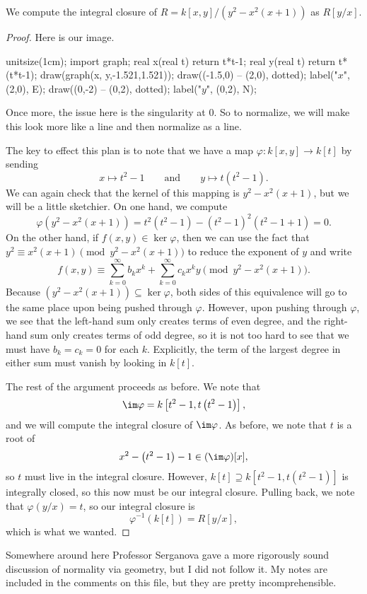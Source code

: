 \begin{exe}
	We compute the integral closure of $R=k[x,y]/\left(y^2-x^2(x+1)\right)$ as $R[y/x]$.
\end{exe}
\begin{proof}
	Here is our image.
	\begin{center}
		\begin{asy}
			unitsize(1cm);
			import graph;
			real x(real t)
			{
				return t*t-1;
			}
			real y(real t)
			{
				return t*(t*t-1);
			}
			draw(graph(x, y,-1.521,1.521));
			draw((-1.5,0) -- (2,0), dotted); label("$x$", (2,0), E);
			draw((0,-2) -- (0,2), dotted); label("$y$", (0,2), N);
		\end{asy}
	\end{center}
	Once more, the issue here is the singularity at $0$. So to normalize, we will make this look more like a line and then normalize as a line.

	The key to effect this plan is to note that we have a map $\varphi:k[x,y]\to k[t]$ by sending
	\[x\mapsto t^2-1\qquad\text{and}\qquad y\mapsto t\left(t^2-1\right).\]
	We can again check that the kernel of this mapping is $y^2-x^2(x+1)$, but we will be a little sketchier. On one hand, we compute
	\[\varphi\left(y^2-x^2(x+1)\right)=t^2\left(t^2-1\right)-\left(t^2-1\right)^2\left(t^2-1+1\right)=0.\]
	On the other hand, if $f(x,y)\in\ker\varphi$, then we can use the fact that $y^2\equiv x^2(x+1)\pmod{y^2-x^2(x+1)}$ to reduce the exponent of $y$ and write
	\[f(x,y)\equiv\sum_{k=0}^\infty b_kx^k+\sum_{k=0}^\infty c_kx^ky\pmod{y^2-x^2(x+1)}.\]
	Because $\left(y^2-x^2(x+1)\right)\subseteq\ker\varphi$, both sides of this equivalence will go to the same place upon being pushed through $\varphi$. However, upon pushing through $\varphi$, we see that the left-hand sum only creates terms of even degree, and the right-hand sum only creates terms of odd degree, so it is not too hard to see that we must have $b_k=c_k=0$ for each $k$. Explicitly, the term of the largest degree in either sum must vanish by looking in $k[t]$.

	The rest of the argument proceeds as before. We note that
	\[\im\varphi=k\left[t^2-1,t\left(t^2-1\right)\right],\]
	and we will compute the integral closure of $\im\varphi$. As before, we note that $t$ is a root of
	\[x^2-\left(t^2-1\right)-1\in(\im\varphi)[x],\]
	so $t$ must live in the integral closure. However, $k[t]\supseteq k\left[t^2-1,t\left(t^2-1\right)\right]$ is integrally closed, so this now must be our integral closure. Pulling back, we note that $\varphi(y/x)=t$, so our integral closure is
	\[\varphi^{-1}(k[t])=\boxed{R[y/x]},\]
	which is what we wanted.
\end{proof}
\begin{remark}[Nir]
	Somewhere around here Professor Serganova gave a more rigorously sound discussion of normality via geometry, but I did not follow it. My notes are included in the comments on this file, but they are pretty incomprehensible.
\end{remark}

